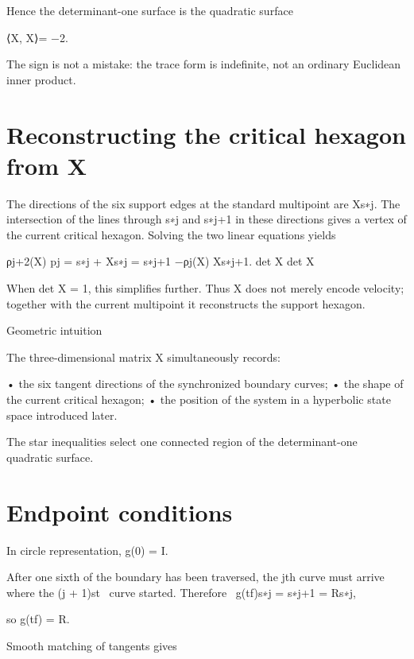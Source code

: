 Hence the determinant-one surface is the quadratic surface


⟨X, X⟩= −2.


The sign is not a mistake: the trace form is indefinite, not an ordinary Euclidean inner product.


\section{Reconstructing the critical hexagon from X}

The directions of the six support edges at the standard multipoint are Xs∗j. The intersection of the lines through s∗j and s∗j+1 in these directions gives a vertex of the current critical hexagon. Solving the two linear equations yields


\begin{displaytext}
ρj+2(X) pj = s∗j + Xs∗j = s∗j+1 −ρj(X) Xs∗j+1. det X det X
\end{displaytext}

When det X = 1, this simplifies further. Thus X does not merely encode velocity; together with the current multipoint it reconstructs the support hexagon.


\begin{insightbox}{Geometric intuition}
\end{insightbox}

The three-dimensional matrix X simultaneously records:


• the six tangent directions of the synchronized boundary curves; • the shape of the current critical hexagon; • the position of the system in a hyperbolic state space introduced later.


The star inequalities select one connected region of the determinant-one quadratic surface.


\section{Endpoint conditions}

In circle representation, g(0) = I.


\begin{displaytext}
After one sixth of the boundary has been traversed, the jth curve must arrive where the (j + 1)st \
curve started. Therefore \
g(tf)s∗j = s∗j+1 = Rs∗j,
\end{displaytext}

so g(tf) = R.


Smooth matching of tangents gives


